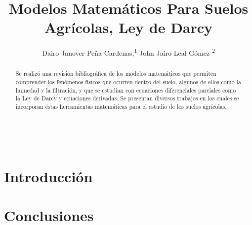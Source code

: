\documentclass[letterpaper,10pt]{article}
\newcommand\authormark[1]{\textsuperscript{#1}}
\begin{document}
\title{Modelos Matemáticos Para Suelos Agrícolas, Ley de Darcy}


\author{Dairo Janover Peña Cardenas,\authormark{1} John Jairo Leal Gómez \authormark{2}}

\address{\authormark{1} Facultad de ingeniería y administración, Universidad Nacional de Colombia - Sede Palmira, Palmira Valle del Cauca , 2022.\\}
\address{\authormark{2,*} Departamento de Ciencias Básicas, Facultad de Ingeniería y Administración, Universidad Nacional de Colombia - Sede Palmira, Palmira Valle del Cauca, 2022. 
}\\




\begin{abstract}

Se realizó una revisión bibliográfica de los modelos matemáticos que permiten comprender los fenómenos físicos que ocurren dentro del suelo, algunos de ellos como la humedad y la filtración, y que se estudian con ecuaciones diferenciales parciales como la Ley de Darcy y ecuaciones derivadas.  Se presentan diversos trabajos en los cuales se incorporan éstas herramientas matemáticas para el estudio de los suelos agrícolas.

\end{abstract}

\section{Introducción}




\section{Conclusiones}


\printbibliography
\end{document}
